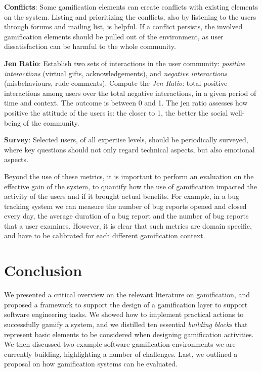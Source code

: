 \textbf{Conflicts}: Some gamification elements can create conflicts with existing elements on the system. Listing and prioritizing the conflicts, also by listening to the users through forums and mailing list, is helpful. If a conflict persists, the involved gamification elements should be pulled out of the environment, as user dissatisfaction can be harmful to the whole community.

\textbf{Jen Ratio}: Establish two sets of interactions in the user community: \emph{positive interactions} (\eg virtual gifts, acknowledgements), and \emph{negative interactions} (\eg misbehaviours, rude comments). Compute the \emph{Jen Ratio}: total positive interactions among users over the total negative interactions, in a given period of time and context. The outcome is between 0 and 1. The jen ratio assesses how positive the attitude of the users is: the closer to 1, the better the social well-being of the community.

\textbf{Survey}: Selected users, of all expertise levels, should be periodically surveyed, where key questions should not only regard technical aspects, but also emotional aspects.


Beyond the use of these metrics, it is important to perform an evaluation on the effective gain of the system, to quantify how the use of gamification impacted the activity of the users and if it brought actual benefits. For example, in a bug tracking system we can measure the number of bug reports opened and closed every day, the average duration of a bug report and the number of bug reports that a user examines. However, it is clear that such metrics are domain specific, and have to be calibrated for each different gamification context.


\section{Conclusion}\label{sec:conclusion}

We presented a critical overview on the relevant literature on gamification, and proposed a framework to support the design of a gamification layer to support software engineering tasks. We showed how to implement practical actions to successfully gamify a system, and we distilled ten essential \emph{building blocks} that represent basic elements to be considered when designing gamification activities. We then discussed two example software gamification environments we are currently building, highlighting a number of challenges. Last, we outlined a proposal on how gamification systems can be evaluated.

